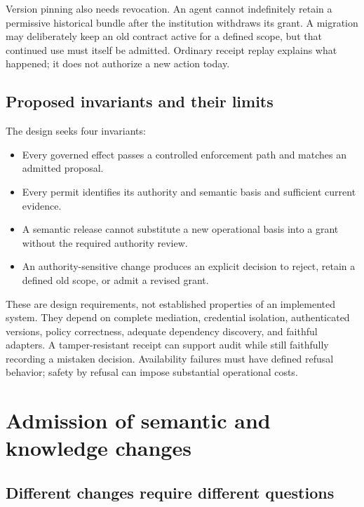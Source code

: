 \documentclass[
  english,
  12pt,
  a4paper,
  preprint,
  numbers,
  nopreprintline]{elsarticle}
\providecommand{\tightlist}{%
  \setlength{\itemsep}{0pt}\setlength{\parskip}{0pt}}
\begin{document}
Version pinning also needs revocation. An agent cannot indefinitely
retain a permissive historical bundle after the institution withdraws
its grant. A migration may deliberately keep an old contract active for
a defined scope, but that continued use must itself be admitted.
Ordinary receipt replay explains what happened; it does not authorize a
new action today.

\subsection{Proposed invariants and their
limits}\label{proposed-invariants-and-their-limits}

The design seeks four invariants:

\begin{itemize}
\tightlist
\item
  Every governed effect passes a controlled enforcement path and matches
  an admitted proposal.
\item
  Every permit identifies its authority and semantic basis and
  sufficient current evidence.
\item
  A semantic release cannot substitute a new operational basis into a
  grant without the required authority review.
\item
  An authority-sensitive change produces an explicit decision to reject,
  retain a defined old scope, or admit a revised grant.
\end{itemize}

These are design requirements, not established properties of an
implemented system. They depend on complete mediation, credential
isolation, authenticated versions, policy correctness, adequate
dependency discovery, and faithful adapters. A tamper-resistant receipt
can support audit while still faithfully recording a mistaken decision.
Availability failures must have defined refusal behavior; safety by
refusal can impose substantial operational costs.

\section{Admission of semantic and knowledge
changes}\label{admission-of-semantic-and-knowledge-changes}

\subsection{Different changes require different
questions}\label{different-changes-require-different-questions}
\end{document}

